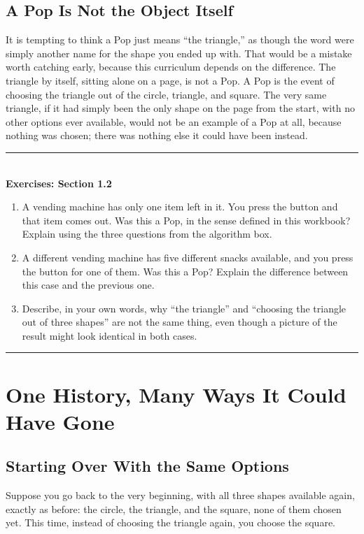 \documentclass[11pt]{book}
\newenvironment{exercisebox}[1]{%
\vspace{0.8em}\noindent\rule{\linewidth}{0.6pt}\\[0.2em]\textbf{Exercises: #1}\\[0.3em]%
\begin{enumerate}[label=\arabic*., itemsep=0.4em]}%
{\end{enumerate}\noindent\rule{\linewidth}{0.6pt}\vspace{0.6em}}
\begin{document}
\section{A Pop Is Not the Object Itself}

It is tempting to think a Pop just means ``the triangle,'' as though the word were simply another name for the shape you ended up with. That would be a mistake worth catching early, because this curriculum depends on the difference. The triangle by itself, sitting alone on a page, is not a Pop. A Pop is the event of choosing the triangle out of the circle, triangle, and square. The very same triangle, if it had simply been the only shape on the page from the start, with no other options ever available, would not be an example of a Pop at all, because nothing was chosen; there was nothing else it could have been instead.

\begin{exercisebox}{Section 1.2}
\item A vending machine has only one item left in it. You press the button and that item comes out. Was this a Pop, in the sense defined in this workbook? Explain using the three questions from the algorithm box.
\item A different vending machine has five different snacks available, and you press the button for one of them. Was this a Pop? Explain the difference between this case and the previous one.
\item Describe, in your own words, why ``the triangle'' and ``choosing the triangle out of three shapes'' are not the same thing, even though a picture of the result might look identical in both cases.
\end{exercisebox}

\chapter{One History, Many Ways It Could Have Gone}

\section{Starting Over With the Same Options}

Suppose you go back to the very beginning, with all three shapes available again, exactly as before: the circle, the triangle, and the square, none of them chosen yet. This time, instead of choosing the triangle again, you choose the square.

\begin{center}
\end{center}
\end{document}
